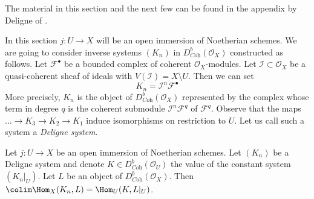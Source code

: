 \noindent
The material in this section and the next few can be found
in the appendix by Deligne of \cite{RD}.

\medskip\noindent
In this section $j : U \to X$ will be an open immersion of Noetherian schemes.
We are going to consider inverse systems $(K_n)$ in
$D^b_{\textit{Coh}}(\mathcal{O}_X)$ constructed as follows.
Let $\mathcal{F}^\bullet$ be a bounded complex of coherent
$\mathcal{O}_X$-modules. Let $\mathcal{I} \subset \mathcal{O}_X$
be a quasi-coherent sheaf of ideals with $V(\mathcal{I}) = X \setminus U$.
Then we can set
$$
K_n = \mathcal{I}^n\mathcal{F}^\bullet
$$
More precisely, $K_n$ is the object of $D^b_{\textit{Coh}}(\mathcal{O}_X)$
represented by the complex whose term in degree $q$
is the coherent submodule $\mathcal{I}^n\mathcal{F}^q$ of $\mathcal{F}^q$.
Observe that the maps $\ldots \to K_3 \to K_2 \to K_1$ induce isomorphisms
on restriction to $U$. Let us call such a system a {\it Deligne system}.

\begin{lemma}
\label{lemma-lift-map}
Let $j : U \to X$ be an open immersion of Noetherian schemes.
Let $(K_n)$ be a Deligne system and denote
$K \in D^b_{\textit{Coh}}(\mathcal{O}_U)$ the value
of the constant system $(K_n|_U)$. Let $L$ be an object of
$D^b_{\textit{Coh}}(\mathcal{O}_X)$.
Then $\colim \Hom_X(K_n, L) = \Hom_U(K, L|_U)$.
\end{lemma}

